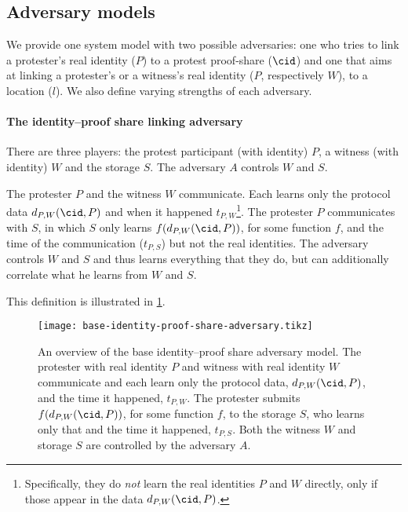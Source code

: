 \subsection{Adversary models}%
\label{adversary-model-different-levels}

We provide one system model with two possible adversaries: one who tries to link a protester's real identity (\(P\)) to a protest proof-share (\(\cid\)) and one 
that aims at linking a protester's or a witness's real identity (\(P\), respectively \(W\)), to a location (\(l\)).
We also define varying strengths of each adversary.

\paragraph{The identity--proof share linking adversary}

There are three players: the protest participant (with identity) \(P\), a witness (with identity) \(W\) and the storage \(S\).
The adversary \(A\) controls \(W\) and \(S\).

\begin{definition}%
  \label{base-identity-proof-share-adversary}
  The protester \(P\) and the witness \(W\) communicate.
  Each learns only the protocol data \(d_{P,W}(\cid, P)\) and when it happened 
  \(t_{P,W}\)\footnote{%
    Specifically, they do \emph{not} learn the real identities \(P\) and \(W\) 
    directly, only if those appear in the data \(d_{P,W}(\cid, P)\).
  }.
  The protester \(P\) communicates with \(S\), in which \(S\) only learns 
  \(f(d_{P,W}(\cid, P))\), for some function \(f\), and the time of the 
  communication (\(t_{P,S}\)) but not the real identities.
  The adversary controls \(W\) and \(S\) and thus learns everything that they 
  do, but can additionally correlate what he learns from \(W\) and \(S\).
\end{definition}

This definition is illustrated in \cref{fig:identity-proof-share-adversary}.

\begin{figure}
  \centering
  \texttt{[image: base-identity-proof-share-adversary.tikz]}
  \caption{\label{fig:identity-proof-share-adversary}%
    An overview of the base identity--proof share adversary model.
    The protester with real identity \(P\) and witness with real identity \(W\) 
    communicate and each learn only the protocol data, \(d_{P,W}(\cid, P)\), 
    and the time it happened, \(t_{P,W}\).
    The protester submits \(f(d_{P,W}(\cid, P))\), for some function \(f\), to 
    the storage \(S\), who learns only that and the time it happened, 
    \(t_{P,S}\).
    Both the witness \(W\) and storage \(S\) are controlled by the adversary 
    \(A\).
  }
\end{figure}


